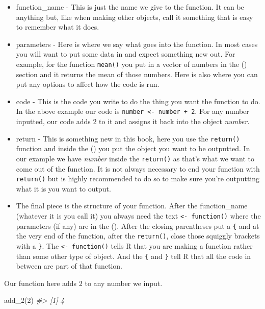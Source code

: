 \documentclass[
]{krantz}
\makeatletter
\newenvironment{Shaded}{\begin{snugshade}}{\end{snugshade}}
\newcommand{\CommentTok}[1]{\textcolor[rgb]{0.37,0.37,0.37}{\textit{#1}}}
\newcommand{\DecValTok}[1]{\textcolor[rgb]{0.06,0.06,0.06}{#1}}
\newcommand{\FunctionTok}[1]{\textcolor[rgb]{0,0,0}{#1}}
\newcommand{\NormalTok}[1]{#1}
\providecommand{\tightlist}{%
  \setlength{\itemsep}{0pt}\setlength{\parskip}{0pt}}
\newenvironment{kframe}{%
\medskip{}
\setlength{\fboxsep}{.8em}
 \def\at@end@of@kframe{}%
 \ifinner\ifhmode%
  \def\at@end@of@kframe{\end{minipage}}%
  \begin{minipage}{\columnwidth}%
 \fi\fi%
 \def\FrameCommand##1{\hskip\@totalleftmargin \hskip-\fboxsep
 \colorbox{shadecolor}{##1}\hskip-\fboxsep
     \hskip-\linewidth \hskip-\@totalleftmargin \hskip\columnwidth}%
 \MakeFramed {\advance\hsize-\width
   \@totalleftmargin\z@ \linewidth\hsize
   \@setminipage}}%
 {\par\unskip\endMakeFramed%
 \at@end@of@kframe}
\renewenvironment{Shaded}{\begin{kframe}}{\end{kframe}}
\makeatother
\begin{document}
\begin{itemize}
\tightlist
\item
  function\_name - This is just the name we give to the
  function. It can be anything but, like when making other
  objects, call it something that is easy to remember what
  it does.
\item
  parameters - Here is where we say what goes into the
  function. In most cases you will want to put some data in
  and expect something new out. For example, for the
  function \texttt{mean()} you put in a vector of numbers in
  the () section and it returns the mean of those numbers.
  Here is also where you can put any options to affect how
  the code is run.
\item
  code - This is the code you write to do the thing you want
  the function to do. In the above example our code is
  \texttt{number\ \textless{}-\ number\ +\ 2}. For any
  number inputted, our code adds 2 to it and assigns it back
  into the object \emph{number}.
\item
  return - This is something new in this book, here you use
  the \texttt{return()} function and inside the () you put
  the object you want to be outputted. In our example we
  have \emph{number} inside the \texttt{return()} as that's
  what we want to come out of the function. It is not always
  necessary to end your function with \texttt{return()} but
  is highly recommended to do so to make sure you're
  outputting what it is you want to output.
\item
  The final piece is the structure of your function. After
  the function\_name (whatever it is you call it) you always
  need the text \texttt{\textless{}-\ function()} where the
  parameters (if any) are in the (). After the closing
  parentheses put a \texttt{\{} and at the very end of the
  function, after the \texttt{return()}, close those
  squiggly brackets with a \texttt{\}}. The
  \texttt{\textless{}-\ function()} tells R that you are
  making a function rather than some other type of object.
  And the \texttt{\{} and \texttt{\}} tell R that all the
  code in between are part of that function.
\end{itemize}

Our function here adds 2 to any number we input.

\begin{Shaded}
\begin{Highlighting}[]
\FunctionTok{add\_2}\NormalTok{(}\DecValTok{2}\NormalTok{)}
\CommentTok{\#\textgreater{} [1] 4}
\end{Highlighting}
\end{Shaded}
\end{document}
